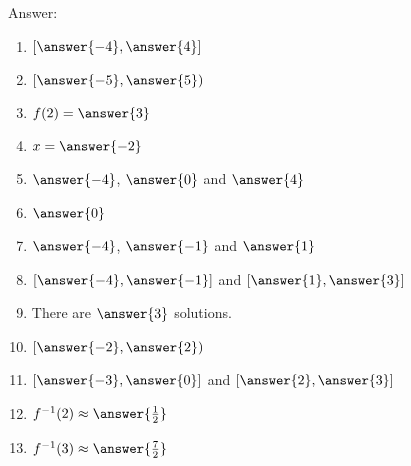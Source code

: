 \documentclass{ximera}
\begin{document}
\begin{exercise}
Answer:

\begin{enumerate}
\item  $[\answer{-4},\answer{4}]$
\item  $[\answer{-5},\answer{5})$
\item  $f(2)=\answer{3}$
\item  $x=\answer{-2}$
\item  $\answer{-4}$, $\answer{0}$ and $\answer{4}$
\item  $\answer{0}$
\item  $\answer{-4}$, $\answer{-1}$ and $\answer{1}$
\item  $[\answer{-4},\answer{-1}]$ and $[\answer{1},\answer{3}]$
\item  There are $\answer{3}$ solutions.
\item  $[\answer{-2},\answer{2})$
\item  $[\answer{-3},\answer{0}]$ and $[\answer{2},\answer{3}]$
\item  $f^{-1}(2)\approx\answer{\frac{1}{2}}$
\item  $f^{-1}(3)\approx\answer{\frac{7}{2}}$
\end{enumerate}

\end{exercise}
\end{document}
